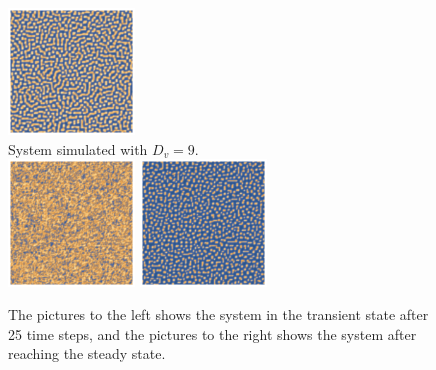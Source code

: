 \begin{figure}[h]
    \includegraphics[width=0.3\textwidth]{img/2bd5.png}\\
    System simulated with $D_v=9$.\\
    \includegraphics[width=0.3\textwidth]{img/2bd9transient.png}
    \includegraphics[width=0.3\textwidth]{img/2bd9.png}
  \caption{\label{fig:pic2} The pictures to the left shows the system in the transient state after 25 time steps, and the pictures to the right shows the system after reaching the steady state.}
\end{figure}

